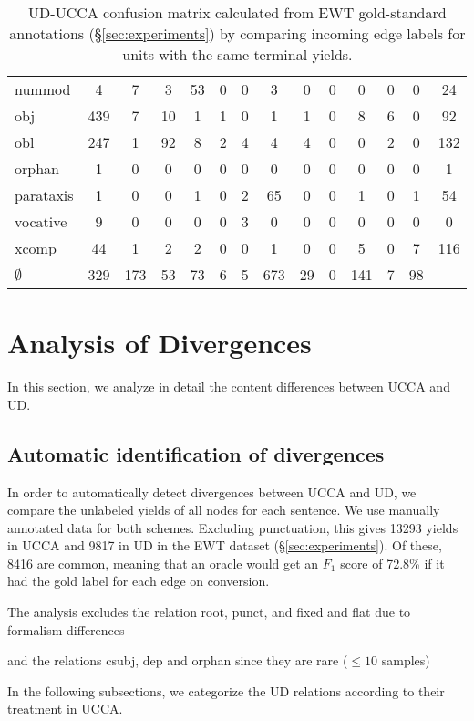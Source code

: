 \documentclass[11pt,a4paper]{article}
\begin{document}
\begin{table}[t]
\begin{tabular}{l|ccccccccccccc}
nummod & 4 & 7 & 3 & 53 & 0 & 0 & 3 & 0 & 0 & 0 & 0 & 0 & 24 \\
obj & 439 & 7 & 10 & 1 & 1 & 0 & 1 & 1 & 0 & 8 & 6 & 0 & 92 \\
obl & 247 & 1 & 92 & 8 & 2 & 4 & 4 & 4 & 0 & 0 & 2 & 0 & 132 \\
orphan & 1 & 0 & 0 & 0 & 0 & 0 & 0 & 0 & 0 & 0 & 0 & 0 & 1 \\
parataxis & 1 & 0 & 0 & 1 & 0 & 2 & 65 & 0 & 0 & 1 & 0 & 1 & 54 \\
vocative & 9 & 0 & 0 & 0 & 0 & 3 & 0 & 0 & 0 & 0 & 0 & 0 & 0 \\
xcomp & 44 & 1 & 2 & 2 & 0 & 0 & 1 & 0 & 0 & 5 & 0 & 7 & 116 \\
$\emptyset$ & 329 & 173 & 53 & 73 & 6 & 5 & 673 & 29 & 0 & 141 & 7 & 98
\end{tabular}
\caption{UD-UCCA confusion matrix calculated from EWT
gold-standard annotations (\S\ref{sec:experiments})
by comparing incoming edge labels for units with the same terminal yields.
\label{tab:confusion_matrix}}
\end{table}



\section{Analysis of Divergences}\label{sec:analysis}

In this section, we analyze in detail the content differences between UCCA and UD.

\subsection{Automatic identification of divergences}

In order to automatically detect divergences between UCCA and UD,
we compare the unlabeled yields of all nodes for each sentence.
We use manually annotated data for both schemes.
Excluding punctuation, this gives 13293 yields in UCCA and
9817 in UD in the EWT dataset (\S\ref{sec:experiments}).
Of these, 8416 are common, meaning that an oracle would get an $F_1$ score
of 72.8\% if it had the gold label for each edge on conversion.

The analysis excludes the relation root, punct, and fixed and flat due to formalism differences

and the relations csubj, dep and orphan since they are rare
($\leq 10$ samples)

In the following subsections, we categorize the UD relations according to their
treatment in UCCA.
\end{document}
